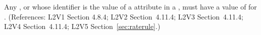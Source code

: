 Any \Compartment, \Species or \Parameter whose identifier is the value of a
 attribute in a \RateRule, must have a value of 
for .  (References: L2V1 Section 4.8.4; L2V2 Section~4.11.4;
L2V3 Section~4.11.4; L2V4 Section~4.11.4; L2V5 Section~\ref{sec:raterule}.)
